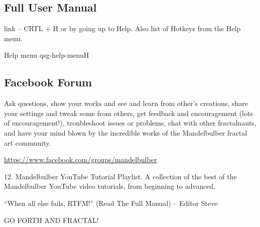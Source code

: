 \subsection{Full User Manual}\label{qsg-help}
 link – CRTL + H or by going up to Help. Also list of Hotkeys from the Help menu.

{Help menu}
{qsg-help-menu}{H}

\subsection{Facebook Forum}\label{qsg-facebook}
Ask questions, show your works and see and learn from other’s creations, share your settings and tweak some from others, get feedback and encouragement (lots of encouragement!), troubleshoot issues or problems, chat with other fractalnauts, and have your mind blown by the incredible works of the Mandelbulber fractal art community. 

\href{https://www.facebook.com/groups/mandelbulber}{https://www.facebook.com/groups/mandelbulber}

    12. Mandelbulber YouTube Tutorial Playlist. A collection of the best of the Mandelbulber YouTube video tutorials, from beginning to advanced. 

“When all else fails, RTFM!” (Read The Full Manual) – Editor Steve

GO FORTH AND FRACTAL!